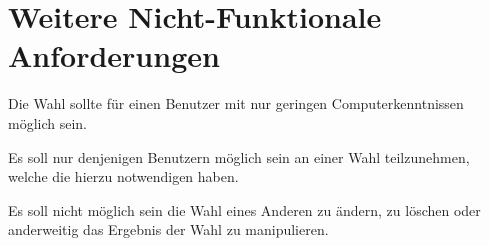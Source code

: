 \documentclass[parskip=full,11pt,twoside]{scrartcl}
\begin{document}
\section{Weitere Nicht-Funktionale Anforderungen}

Die \gls{Wahl} sollte für einen \gls{Benutzer} mit nur geringen Computerkenntnissen möglich sein.

Es soll nur denjenigen Benutzern möglich sein an einer \gls{Wahl} teilzunehmen, welche die hierzu notwendigen  haben.

Es soll nicht möglich sein die \gls{Wahl} eines Anderen zu ändern,  zu löschen oder anderweitig das Ergebnis der \gls{Wahl} zu manipulieren.
\end{document}
